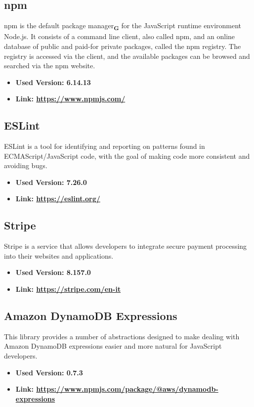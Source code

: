 \subsection{npm}
npm is the default package manager\textsubscript{\textbf{G}} for the JavaScript runtime environment Node.js.
It consists of a command line client, also called npm, and an online database of public and paid-for private packages,
called the npm registry. The registry is accessed via the client, and the available packages can be browsed and
searched via the npm website.
\begin{itemize}
  \item \textbf{Used Version: 6.14.13}
  \item \textbf{Link: \url{https://www.npmjs.com/}}
\end{itemize}
\subsection{ESLint}
ESLint is a tool for identifying and reporting on patterns found in ECMAScript/JavaScript code, with the goal of making code more consistent and avoiding bugs.
\begin{itemize}
  \item \textbf{Used Version: 7.26.0}
  \item \textbf{Link: \url{https://eslint.org/}}
\end{itemize}
\subsection{Stripe}
Stripe is a service that allows developers to integrate secure payment processing into their websites and applications.
\begin{itemize}
  \item \textbf{Used Version: 8.157.0}
  \item \textbf{Link: \url{https://stripe.com/en-it}}
\end{itemize}
\subsection{Amazon DynamoDB Expressions}
This library provides a number of abstractions designed to make dealing with Amazon DynamoDB expressions easier and more natural for JavaScript developers.
\begin{itemize}
  \item \textbf{Used Version: 0.7.3}
  \item \textbf{Link: \url{https://www.npmjs.com/package/@aws/dynamodb-expressions}}
\end{itemize}
